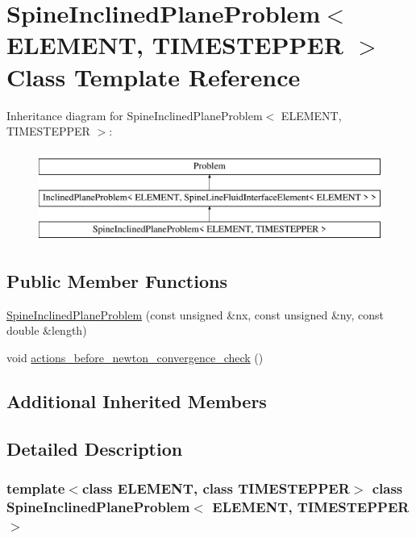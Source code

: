 \hypertarget{classSpineInclinedPlaneProblem}{}\section{Spine\+Inclined\+Plane\+Problem$<$ E\+L\+E\+M\+E\+NT, T\+I\+M\+E\+S\+T\+E\+P\+P\+ER $>$ Class Template Reference}
\label{classSpineInclinedPlaneProblem}
Inheritance diagram for Spine\+Inclined\+Plane\+Problem$<$ E\+L\+E\+M\+E\+NT, T\+I\+M\+E\+S\+T\+E\+P\+P\+ER $>$\+:\begin{figure}[H]
\begin{center}
\leavevmode
\includegraphics[height=3.000000cm]{classSpineInclinedPlaneProblem}
\end{center}
\end{figure}
\subsection*{Public Member Functions}
\begin{DoxyCompactItemize}
\item 
\hyperlink{classSpineInclinedPlaneProblem_a5eba548aaedf82845fd02403f06a42f7}{Spine\+Inclined\+Plane\+Problem} (const unsigned \&nx, const unsigned \&ny, const double \&length)
\item 
void \hyperlink{classSpineInclinedPlaneProblem_af05f87be8b233df5a296f6375001d385}{actions\+\_\+before\+\_\+newton\+\_\+convergence\+\_\+check} ()
\end{DoxyCompactItemize}
\subsection*{Additional Inherited Members}


\subsection{Detailed Description}
\subsubsection*{template$<$class E\+L\+E\+M\+E\+NT, class T\+I\+M\+E\+S\+T\+E\+P\+P\+ER$>$\newline
class Spine\+Inclined\+Plane\+Problem$<$ E\+L\+E\+M\+E\+N\+T, T\+I\+M\+E\+S\+T\+E\+P\+P\+E\+R $>$}



